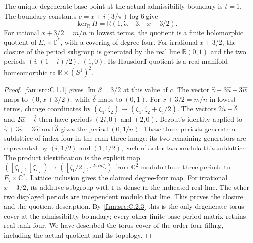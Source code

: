 \begin{proposition}\label{fam:src:C.3.2}\label{fam:st:C.3.2}
The unique degenerate base point at the actual admissibility boundary is
\(t=1\). The boundary constants
\(c=x+i(3/\pi)\log6\) give
\[
 \ker_{\mathbb R}\Pi=\mathbb R(1,3,-3,-x-3/2).
\]
For rational $x+3/2=m/n$ in lowest terms, the quotient is a
finite holomorphic quotient of $E_i\times\mathbb C^*$, with a covering
of degree four. For irrational \(x+3/2\), the closure of the period subgroup is generated
by the real line \(\mathbb R(0,1)\) and the two periods
\((i,(1-i)/2)\), \((1,0)\). Its Hausdorff quotient is a real manifold
homeomorphic to \(\mathbb R\times(S^1)^2\).
\end{proposition}

\begin{proof}
\ref{fam:src:C.1.1} gives \(\operatorname{Im}\beta=3/2\) at this value of \(c\).
The vector \(\widehat\gamma+3\widehat u-3\widehat w\) maps to
\((0,x+3/2)\), while \(\widehat\delta\) maps to \((0,1)\).
For $x+3/2=m/n$ in lowest terms, change coordinates by
$(\zeta_1,\zeta_2)\mapsto(\zeta_1,\zeta_2+\zeta_1/2)$.
The vectors $2\widehat u-\widehat\delta$ and
$2\widehat w-\widehat\delta$ then have periods $(2i,0)$ and $(2,0)$.
Bezout's identity applied to $\widehat\gamma+3\widehat u-3\widehat w$
and $\widehat\delta$ gives the period $(0,1/n)$.
These three periods generate a sublattice of index four in the rank-three
image: its two remaining generators are represented by
$(i,1/2)$ and $(1,1/2)$, each of order two modulo this sublattice.
The product identification is the explicit map
$([\zeta_1],[\zeta_2])\mapsto([\zeta_1/2],e^{2\pi in\zeta_2})$
from $\mathbb C^2$ modulo these three periods to $E_i\times\mathbb C^*$. Lattice inclusion gives the claimed degree-four map.
For irrational $x+3/2$, its additive subgroup with $1$ is dense in the
indicated real line. The other two displayed periods are independent
modulo that line. This proves the closure and the quotient description.
By \ref{fam:src:C.2.3} this is the only degenerate torus cover at the admissibility
boundary; every other finite-base period matrix retains real rank four.
We have described the torus cover of the order-four filling, including
the actual quotient and its topology.
\end{proof}